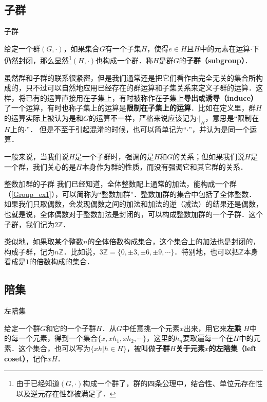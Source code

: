 
\subsection{子群}

\begin{definition}{子群}

给定一个群$(G, \cdot)$，如果集合$G$有一个子集$H$，使得$e\in H$且$H$中的元素在运算$\cdot$下仍然封闭，那么显然\footnote{由于已经知道$(G,\cdot)$构成一个群了，群的四条公理中，结合性、单位元存在性以及逆元存在性都被满足了．}$(H,\cdot)$也构成一个群．称$H$是群$G$的\textbf{子群（subgroup）}．

\end{definition}

虽然群和子群的联系很紧密，但是我们通常还是把它们看作由完全无关的集合所构成的，只不过可以自然地应用已经存在的群运算和子集关系来定义子群的运算．这样，将已有的运算直接用在子集上，有时被称作在子集上\textbf{导出}或\textbf{诱导（induce）}了一个运算，有时也称子集上的运算是\textbf{限制在子集上的运算}．比如在定义里，群$H$的运算实际上被认为是和$G$的运算不一样，严格来说应该记为$\cdot|_H$，意思是“限制在$H$上的$\cdot$”． 但是不至于引起混淆的时候，也可以简单记为“$\cdot$”，并认为是同一个运算．

一般来说，当我们说$H$是一个子群时，强调的是$H$和$G$的关系；但如果我们说$H$是一个群，我们关心的是$H$本身作为群的性质，而没有强调它和其它群的关系．

\begin{example}{整数加群的子群}\label{Group1_ex1}
我们已经知道，全体整数配上通常的加法，能构成一个群（\autoref{Group_ex1}），可以简称为“整数加群”．整数加群的集合中包括了全体整数．如果我们只取偶数，会发现偶数之间的加法和加法的逆（减法）的结果还是偶数，也就是说，全体偶数对于整数加法是封闭的，可以构成整数加群的一个子群．这个子群，我们记为$2\mathbb{Z}$．

类似地，如果取某个整数$n$的全体倍数构成集合，这个集合上的加法也是封闭的，构成子群，记为$n\mathbb{Z}$．比如说，$3\mathbb{Z}=\{0, \pm3, \pm6, \pm9, \cdots\}$．特别地，也可以把$\mathbb{Z}$本身看成是$1$的倍数构成的集合．
\end{example}



\subsection{陪集}

\begin{definition}{左陪集}

给定一个群$G$和它的一个子群$H$．从$G$中任意挑一个元素$x$出来，用它来\textbf{左乘} $H$中的每一个元素，得到一个集合$\{x, xh_1, xh_2, \cdots\}$，这里的$h_n$要取遍每一个在$H$中的元素．这个集合，也可以写为$\{xh|h\in H\}$，被叫做\textbf{子群$H$关于元素$x$的左陪集（left coset）}，记作$xH$． 

\end{definition}


